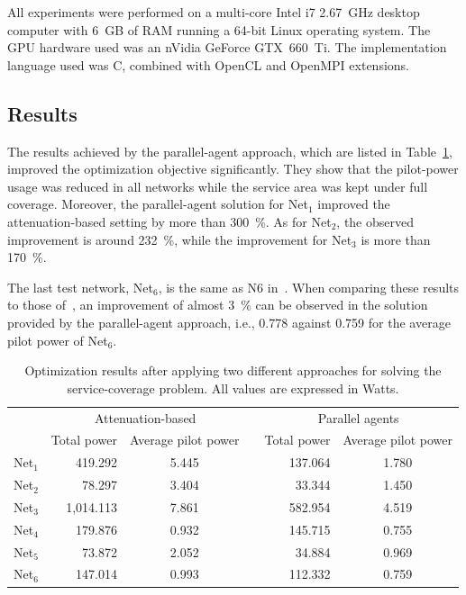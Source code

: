 \bigskip{}


All experiments were performed on a multi-core Intel i7 2.67~GHz
desktop computer with 6~GB of RAM running a 64-bit Linux operating
system. The GPU hardware used was an nVidia GeForce GTX~660~Ti.
The implementation language used was C, combined with OpenCL and OpenMPI
extensions.


\subsection{Results}

The results achieved by the parallel-agent approach, which are listed
in Table~\ref{tab:06-Optimization_results}, improved the optimization
objective significantly. They show that the pilot-power usage was
reduced in all networks while the service area was kept under full
coverage. Moreover, the parallel-agent solution for Net$_{1}$ improved
the attenuation-based setting by more than 300~\%. As for Net$_{2}$,
the observed improvement is around 232~\%, while the improvement
for Net$_{3}$ is more than 170~\%. 

The last test network, Net$_{6}$, is the same as N6 in~\cite{Siomina:Minimum.pilot.power.for.service.coverage}.
When comparing these results to those of~\cite{Siomina:Minimum.pilot.power.for.service.coverage},
an improvement of almost 3~\% can be observed in the solution provided
by the parallel-agent approach, i.e., 0.778 against 0.759 for the
average pilot power of Net$_{6}$.

\begin{table}
\caption{Optimization results after applying two different approaches for solving
the service-coverage problem. All values are expressed in Watts.\emph{\label{tab:06-Optimization_results}}}


\centering

\begin{tabular}{crccrc}
\cmidrule{2-6} 
 & \multicolumn{2}{c}{Attenuation-based} &  & \multicolumn{2}{c}{Parallel agents}\tabularnewline\addlinespace
\cmidrule{2-3} \cmidrule{5-6} 
 & Total power & Average pilot power &  & Total power & Average pilot power\tabularnewline\addlinespace
\cmidrule{1-3} \cmidrule{5-6} 
Net$_{1}$ & 419.292 & 5.445 &  & 137.064 & 1.780\tabularnewline
Net$_{2}$ & 78.297 & 3.404 &  & 33.344 & 1.450\tabularnewline
Net$_{3}$ & 1,014.113 & 7.861 &  & 582.954 & 4.519\tabularnewline
Net$_{4}$ & 179.876 & 0.932 &  & 145.715 & 0.755\tabularnewline
Net$_{5}$ & 73.872 & 2.052 &  & 34.884 & 0.969\tabularnewline
Net$_{6}$ & 147.014 & 0.993 &  & 112.332 & 0.759\tabularnewline
\bottomrule
\end{tabular}
\end{table}



